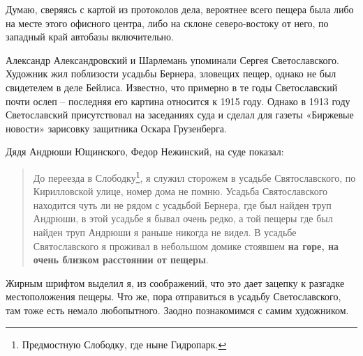 Думаю, сверяясь с картой из протоколов дела, вероятнее всего пещера была либо на месте этого офисного центра, либо на склоне северо-востоку от него, по западный край автобазы включительно. 

Александр Александровский и Шарлемань упоминали Сергея Светославского. Художник жил поблизости усадьбы Бернера, зловещих пещер, однако не был свидетелем в деле Бейлиса. Известно, что примерно в те годы Светославский почти ослеп – последняя его картина относится к 1915 году. Однако в 1913 году Светославский присутствовал на заседаниях суда и сделал для газеты «Биржевые новости» зарисовку защитника Оскара Грузенберга.

Дядя Андрюши Ющинского, Федор Нежинский, на суде показал:

\begin{quotation}
До переезда в Слободку\footnote{Предмостную Слободку, где ныне Гидропарк.}, я служил сторожем в усадьбе Святославского, по Кирилловской улице, номер дома не помню. Усадьба Святославского находится чуть ли не рядом с усадьбой Бернера, где был найден труп Андрюши, в этой усадьбе я бывал очень редко, а той пещеры где был найден труп Андрюши я раньше никогда не видел. В усадьбе Святославского я проживал в небольшом домике стоявшем \textbf{на горе, на очень близком расстоянии от пещеры}.
\end{quotation}

Жирным шрифтом выделил я, из соображений, что это дает зацепку к разгадке местоположения пещеры. Что же, пора отправиться в усадьбу Светославского, там тоже есть немало любопытного. Заодно познакомимся с самим художником.